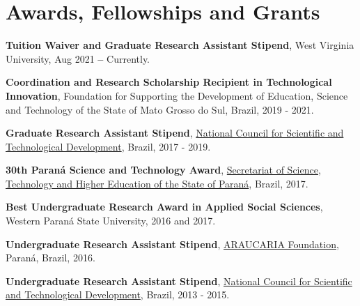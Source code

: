 \documentclass[letterpaper,11pt]{article}
\newcommand{\resumeSubHeadingListStart}{\begin{itemize}[leftmargin=0.15in, label={}]}
\newcommand{\resumeSubHeadingListEnd}{\end{itemize}}
\begin{document}
 
\section{Awards, Fellowships and Grants}
\vspace{3pt}

  \resumeSubHeadingListStart
    \small{\item{
        \textbf{Tuition Waiver and Graduate Research Assistant Stipend}{, West Virginia University, Aug 2021 \textbf{--} Currently.} \\ \vspace{2pt}

        \textbf{Coordination and Research Scholarship Recipient in Technological Innovation}{, Foundation for Supporting the Development of Education, Science and Technology of the State of Mato Grosso do Sul, Brazil, 2019 - 2021.} \\ \vspace{2pt}
        
        \textbf{Graduate Research Assistant Stipend}{, \href{https://memoria.cnpq.br/pibic/}{National Council for Scientific and Technological Development}, Brazil, 2017 - 2019.} \\ \vspace{2pt}
        
        \textbf{30th Paraná Science and Technology Award}{, \href{https://www.seti.pr.gov.br/ppct/}{Secretariat of Science, Technology and Higher Education of the State of Paraná}, Brazil, 2017.} \\ \vspace{2pt}
        
        \textbf{Best Undergraduate Research Award in Applied Social Sciences}{, Western Paraná State University, 2016 and 2017.} \\ \vspace{2pt}
        
        \textbf{Undergraduate Research Assistant Stipend}{, \href{https://www.fappr.pr.gov.br/}{ARAUCARIA Foundation}, Paraná, Brazil, 2016.} \\ \vspace{2pt}

        \textbf{Undergraduate Research Assistant Stipend}{, \href{https://memoria.cnpq.br/pibic/}{National Council for Scientific and Technological Development}, Brazil, 2013 - 2015.} \\ \vspace{2pt}

    }}
  \resumeSubHeadingListEnd
\end{document}
